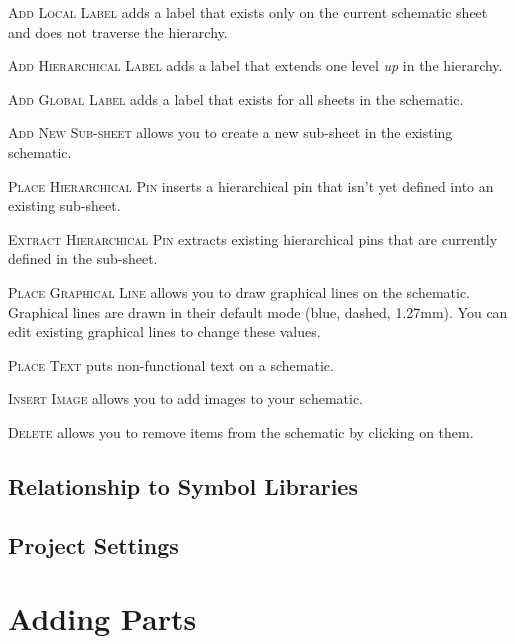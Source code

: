 \textsc{Add Local Label} adds a label that exists only on the current schematic sheet and does not traverse the hierarchy.

\textsc{Add Hierarchical Label} adds a label that extends one level \textit{up} in the hierarchy.

\textsc{Add Global Label} adds a label that exists for all sheets in the schematic.

\textsc{Add New Sub-sheet} allows you to create a new sub-sheet in the existing schematic.

\textsc{Place Hierarchical Pin} inserts a hierarchical pin that isn't yet defined into an existing sub-sheet.

\textsc{Extract Hierarchical Pin} extracts existing hierarchical pins that are currently defined in the sub-sheet.

\textsc{Place Graphical Line} allows you to draw graphical lines on the schematic.
Graphical lines are drawn in their default mode (blue, dashed, 1.27mm).
You can edit existing graphical lines to change these values.

\textsc{Place Text} puts non-functional text on a schematic.

\textsc{Insert Image} allows you to add images to your schematic.

\textsc{Delete} allows you to remove items from the schematic by clicking on them.

\subsection{Relationship to Symbol Libraries}

\subsection{Project Settings}

\section{Adding Parts}

